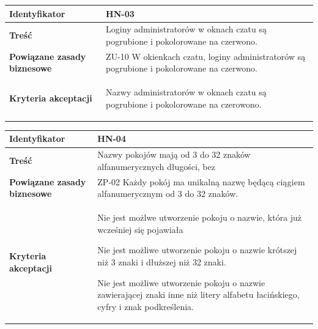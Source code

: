 \vspace{1em}

\begin{tabular}{ | l | l | }
	\hline
		\textbf{Identyfikator} &
		HN-03
		\\

	\hline
		\textbf{Treść} & \parbox[t]{11.5cm}{\strut
			Loginy administratorów w oknach czatu są pogrubione i pokolorowane na czerwono.
		\strut}\\

	\hline
		\parbox[t]{4cm}{\textbf{Powiązane zasady biznesowe}} & \parbox[t]{11.5cm}{\strut
			ZU-10 W okienkach czatu, loginy administratorów są pogrubione i pokolorowane na czerwono.
		\strut}\\

	\hline
		\parbox[t]{4cm}{\textbf{Kryteria akceptacji}} & \parbox[t]{11.5cm}{\strut
			\begin{enumreq}
				\item Nazwy administratorów w oknach czatu są pogrubione
        i pokolorowane na czerowono.
			\end{enumreq}
			\strut}
		\\

	\hline
\end{tabular}

\vspace{1em}

\begin{tabular}{ | l | l | }
	\hline
		\textbf{Identyfikator} &
		HN-04
		\\

	\hline
		\textbf{Treść} & \parbox[t]{11.5cm}{\strut
			Nazwy pokojów mają od 3 do 32 znaków alfanumerycznych długości, bez
		\strut}\\

	\hline
		\parbox[t]{4cm}{\textbf{Powiązane zasady biznesowe}} & \parbox[t]{11.5cm}{\strut
			ZP-02 Każdy pokój ma unikalną nazwę będącą ciągiem
      alfanumerycznym od 3 do 32 znaków.
		\strut}\\

	\hline
		\parbox[t]{4cm}{\textbf{Kryteria akceptacji}} & \parbox[t]{11.5cm}{\strut
			\begin{enumreq}
				\item Nie jest możlwe utworzenie pokoju o nazwie, która
        już wcześniej się pojawiała
        \item Nie jest możliwe utworzenie pokoju o nazwie krótszej niż 3 znaki i dłuższej niż 32 znaki.
        \item Nie jest możliwe utworzenie pokoju o nazwie zawierającej znaki inne niż litery alfabetu łacińskiego, cyfry i znak podkreślenia.
			\end{enumreq}
			\strut}
		\\

	\hline
\end{tabular}

